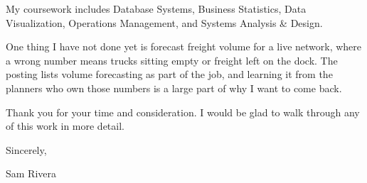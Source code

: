 \documentclass[letterpaper,11pt]{article}
\begin{document}
My coursework includes Database Systems, Business Statistics, Data Visualization, Operations Management, and Systems Analysis \& Design.

One thing I have not done yet is forecast freight volume for a live network, where a wrong number means trucks sitting empty or freight left on the dock. The posting lists volume forecasting as part of the job, and learning it from the planners who own those numbers is a large part of why I want to come back.

Thank you for your time and consideration. I would be glad to walk through any of this work in more detail.

Sincerely,

Sam Rivera
\end{document}
